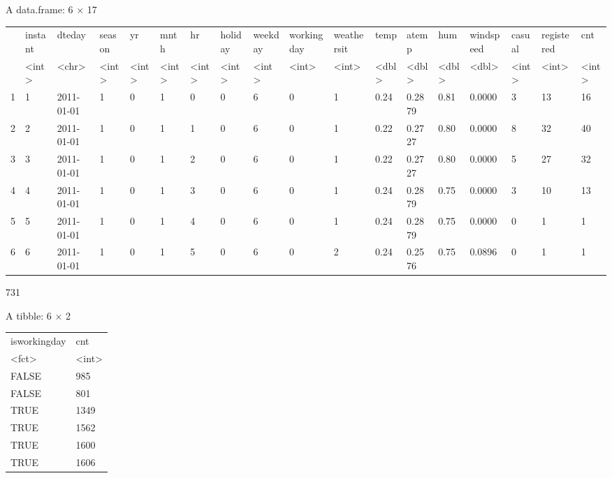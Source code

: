 \documentclass[11pt]{article}
\begin{document}
    A data.frame: 6 × 17
\begin{tabular}{r|lllllllllllllllll}
  & instant & dteday & season & yr & mnth & hr & holiday & weekday & workingday & weathersit & temp & atemp & hum & windspeed & casual & registered & cnt\\
  & <int> & <chr> & <int> & <int> & <int> & <int> & <int> & <int> & <int> & <int> & <dbl> & <dbl> & <dbl> & <dbl> & <int> & <int> & <int>\\
\hline
	1 & 1 & 2011-01-01 & 1 & 0 & 1 & 0 & 0 & 6 & 0 & 1 & 0.24 & 0.2879 & 0.81 & 0.0000 & 3 & 13 & 16\\
	2 & 2 & 2011-01-01 & 1 & 0 & 1 & 1 & 0 & 6 & 0 & 1 & 0.22 & 0.2727 & 0.80 & 0.0000 & 8 & 32 & 40\\
	3 & 3 & 2011-01-01 & 1 & 0 & 1 & 2 & 0 & 6 & 0 & 1 & 0.22 & 0.2727 & 0.80 & 0.0000 & 5 & 27 & 32\\
	4 & 4 & 2011-01-01 & 1 & 0 & 1 & 3 & 0 & 6 & 0 & 1 & 0.24 & 0.2879 & 0.75 & 0.0000 & 3 & 10 & 13\\
	5 & 5 & 2011-01-01 & 1 & 0 & 1 & 4 & 0 & 6 & 0 & 1 & 0.24 & 0.2879 & 0.75 & 0.0000 & 0 &  1 &  1\\
	6 & 6 & 2011-01-01 & 1 & 0 & 1 & 5 & 0 & 6 & 0 & 2 & 0.24 & 0.2576 & 0.75 & 0.0896 & 0 &  1 &  1\\
\end{tabular}


    
    731

    
    A tibble: 6 × 2
\begin{tabular}{ll}
 isworkingday & cnt\\
 <fct> & <int>\\
\hline
	 FALSE &  985\\
	 FALSE &  801\\
	 TRUE  & 1349\\
	 TRUE  & 1562\\
	 TRUE  & 1600\\
	 TRUE  & 1606\\
\end{tabular}
\end{document}
